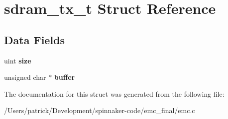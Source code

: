 \hypertarget{structsdram__tx__t}{}\section{sdram\+\_\+tx\+\_\+t Struct Reference}
\label{structsdram__tx__t}
\subsection*{Data Fields}
\begin{DoxyCompactItemize}
\item 
uint {\bfseries size}\hypertarget{structsdram__tx__t_a22d26304a3b3aca97e6311f6939dd1bf}{}\label{structsdram__tx__t_a22d26304a3b3aca97e6311f6939dd1bf}

\item 
unsigned char $\ast$ {\bfseries buffer}\hypertarget{structsdram__tx__t_a70e7ad2e1a45c8db5fba9ad4778bd400}{}\label{structsdram__tx__t_a70e7ad2e1a45c8db5fba9ad4778bd400}

\end{DoxyCompactItemize}


The documentation for this struct was generated from the following file\+:\begin{DoxyCompactItemize}
\item 
/\+Users/patrick/\+Development/spinnaker-\/code/emc\+\_\+final/emc.\+c\end{DoxyCompactItemize}

